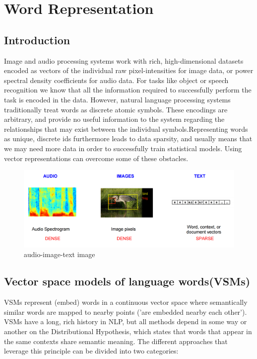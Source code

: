 \section{Word Representation}
\label{chap:Word Representation}

  \subsection{Introduction}

Image and audio processing systems work with rich, high-dimensional datasets encoded as vectors of the individual raw pixel-intensities for image data, or power spectral density coefficients for audio data. For tasks like object or speech recognition we know that all the information required to successfully perform the task is encoded in the data. However, natural language processing systems traditionally treat words as discrete atomic symbols. These encodings are arbitrary, and provide no useful information to the system regarding the relationships that may exist between the individual symbols.Representing words as unique, discrete ids furthermore leads to data sparsity, and usually means that we may need more data in order to successfully train statistical models. Using vector representations can overcome some of these obstacles\cite{web001}\@.
  
 \begin{figure}[H]%
    \center%
    \includegraphics[width=1\textwidth]{images/amira/audio-image-text.png}%
    \caption[Audio-image-text representation]{audio-image-text image}\label{fig:audio-image-text}%
 \end{figure}
 
\subsection{Vector space models of language words(VSMs)}
    VSMs represent (embed) words in a continuous vector space where semantically similar words are mapped to nearby points ('are embedded nearby each other').
    VSMs have a long, rich history in NLP, but all methods depend in some way or another on the Distributional Hypothesis, which states that words that appear in the same contexts share semantic meaning. The different approaches that leverage this principle can be divided into two categories:
  
